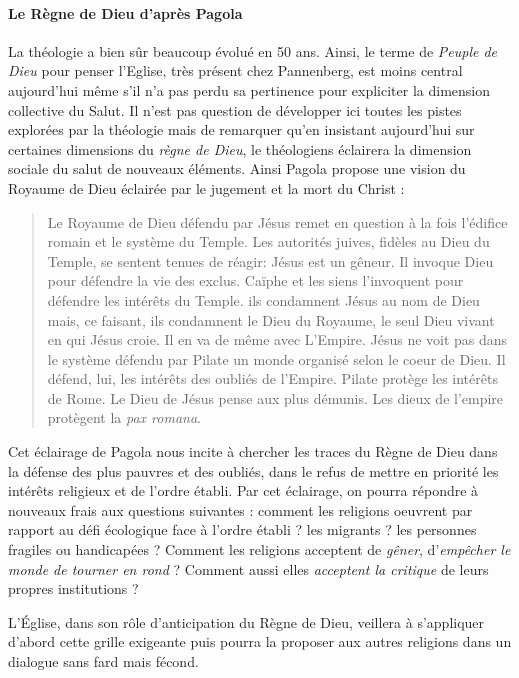 \paragraph{Le Règne de Dieu d'après Pagola}
La théologie a bien sûr beaucoup évolué en 50 ans. Ainsi, le terme de \textit{Peuple de Dieu} pour penser l'Eglise, très présent chez Pannenberg, est moins central aujourd'hui même s'il n'a pas perdu sa pertinence pour expliciter la dimension collective du Salut. Il n'est pas question de développer ici toutes les pistes explorées par la théologie  mais de remarquer qu'en insistant aujourd'hui sur certaines dimensions du \textit{règne de Dieu}, le théologiens éclairera la dimension sociale du salut de nouveaux éléments.
Ainsi Pagola propose une vision du Royaume de Dieu éclairée par le jugement et la mort du Christ : 
\begin{quote}
    Le Royaume de Dieu défendu par Jésus remet en question à la fois l'édifice romain et le système du Temple. Les autorités juives, fidèles au Dieu du Temple, se sentent tenues de réagir: Jésus est un gêneur. Il invoque Dieu pour défendre la vie des exclus. Caïphe et les siens l'invoquent pour défendre les intérêts du Temple. ils condamnent Jésus au nom de Dieu mais, ce faisant, ils condamnent le Dieu du Royaume, le seul Dieu vivant en qui Jésus croie. Il en va de même avec L'Empire. Jésus ne voit pas dans le système défendu par Pilate un monde organisé selon le coeur de Dieu. Il défend, lui, les intérêts des oubliés de l'Empire. Pilate protège les intérêts de Rome. Le Dieu de Jésus pense aux plus démunis. Les dieux de l'empire protègent la \textit{pax romana}.\cite[p. 402]{Pagola:Jesus} 
\end{quote}

Cet éclairage de Pagola nous incite à chercher les traces du Règne de Dieu dans la défense des plus pauvres et des oubliés, dans le refus de mettre en priorité les intérêts religieux et de l'ordre établi. Par cet éclairage, on pourra répondre à nouveaux frais aux questions suivantes :  comment les religions oeuvrent par rapport au défi écologique face à l'ordre établi ? les migrants ? les personnes fragiles ou handicapées ? Comment les religions acceptent de \textit{gêner}, d'\textit{empêcher le monde de tourner en rond} ? Comment aussi elles \textit{acceptent la critique} de leurs propres institutions ? 


L'Église, dans son rôle d'anticipation du Règne de Dieu, veillera à s'appliquer d'abord cette grille exigeante puis pourra la proposer aux autres religions dans un dialogue sans fard mais fécond.

